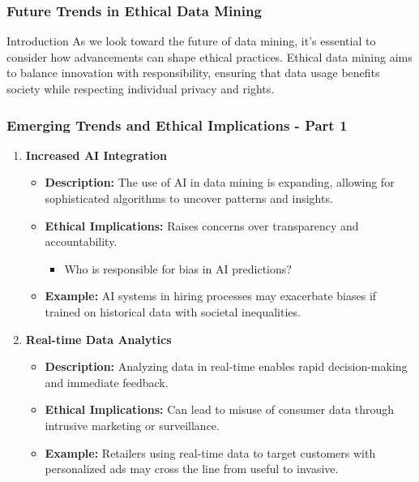 \documentclass{beamer}
\begin{document}
\begin{frame}[fragile]
    \frametitle{Future Trends in Ethical Data Mining}
    \begin{block}{Introduction}
        As we look toward the future of data mining, it's essential to consider how advancements can shape ethical practices.  
        Ethical data mining aims to balance innovation with responsibility, ensuring that data usage benefits society while respecting individual privacy and rights.
    \end{block}
\end{frame}

\begin{frame}[fragile]
    \frametitle{Emerging Trends and Ethical Implications - Part 1}
    \begin{enumerate}
        \item \textbf{Increased AI Integration}
            \begin{itemize}
                \item \textbf{Description:} The use of AI in data mining is expanding, allowing for sophisticated algorithms to uncover patterns and insights.
                \item \textbf{Ethical Implications:} Raises concerns over transparency and accountability. 
                \begin{itemize}
                    \item Who is responsible for bias in AI predictions?
                \end{itemize}
                \item \textbf{Example:} AI systems in hiring processes may exacerbate biases if trained on historical data with societal inequalities.
            \end{itemize}
        
        \item \textbf{Real-time Data Analytics}
            \begin{itemize}
                \item \textbf{Description:} Analyzing data in real-time enables rapid decision-making and immediate feedback.
                \item \textbf{Ethical Implications:} Can lead to misuse of consumer data through intrusive marketing or surveillance.
                \item \textbf{Example:} Retailers using real-time data to target customers with personalized ads may cross the line from useful to invasive.
            \end{itemize}
    \end{enumerate}
\end{frame}
\end{document}
